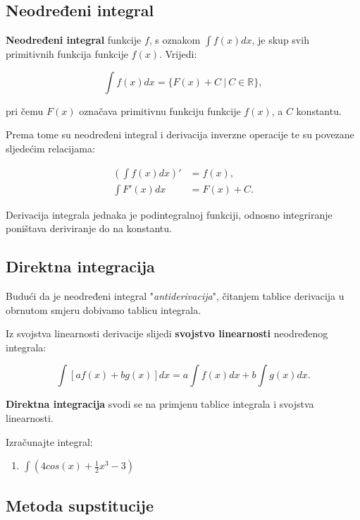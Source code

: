 \subsection{Neodređeni integral}

\textbf{Neodređeni integral} funkcije $f$, s oznakom $\int f(x)dx$, je skup svih
primitivnih funkcija funkcije $f(x)$. Vrijedi:

$$
\int f(x)dx = \{F(x) + C\ |\ C\in\mathbb{R}\},
$$

pri čemu $F(x)$ označava primitivnu funkciju funkcije $f(x)$, a $C$ konstantu.

Prema tome su neodređeni integral i derivacija inverzne operacije te su povezane
sljedećim relacijama:

\begin{align*}
    \left(\int f(x) dx\right)' &= f(x),\\
    \int F'(x) dx &= F(x) + C.
\end{align*}

Derivacija integrala jednaka je podintegralnoj funkciji, odnosno integriranje
poništava deriviranje do na konstantu.

\subsection{Direktna integracija}

Budući da je neodređeni integral "\textit{antiderivacija}", čitanjem tablice
derivacija u obrnutom smjeru dobivamo tablicu integrala.

Iz svojstva linearnosti derivacije slijedi \textbf{svojstvo linearnosti}
neodređenog integrala:

$$
\int \left[af(x) + bg(x)\right] dx = a \int f(x) dx + b \int g(x) dx.
$$

\textbf{Direktna integracija} svodi se na primjenu tablice integrala i svojstva
linearnosti.

\begin{example}
    Izračunajte integral:

    \begin{enumerate}
        \item $\displaystyle \int \left(4 cos(x) + \frac{1}{2} x^3 - 3\right)$
    \end{enumerate}
\end{example}

\subsection{Metoda supstitucije}

